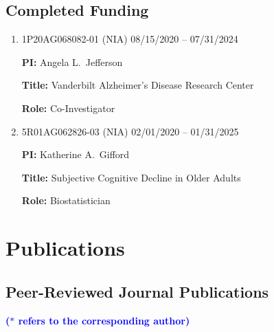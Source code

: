 \documentclass[12pt]{article}
\begin{document}
	\subsection*{Completed Funding}
	\begin{enumerate}		
		\item 1P20AG068082-01 (NIA) \hfill 08/15/2020 -- 
		07/31/2024
		
		{\bf PI:} Angela L.\ Jefferson
		
		{\bf Title:} Vanderbilt Alzheimer's Disease Research Center
		
		{\bf Role:} Co-Investigator
		
		\item 5R01AG062826-03 (NIA) \hfill 02/01/2020 -- 01/31/2025
		
		{\bf PI:} Katherine A.\ Gifford
		
		{\bf Title:} Subjective Cognitive Decline in Older Adults
		
		{\bf Role:} Biostatistician
	\end{enumerate}

	
	\section*{Publications}
	\subsection*{Peer-Reviewed Journal Publications}
	
	{\bf \textcolor{blue}{($\ast$ refers to the corresponding author)}}
	
	\noindent {\bf \textcolor{brown}{($\dagger$ refers to my 
	students, postdocs or trainees)}}
	
\end{document}
